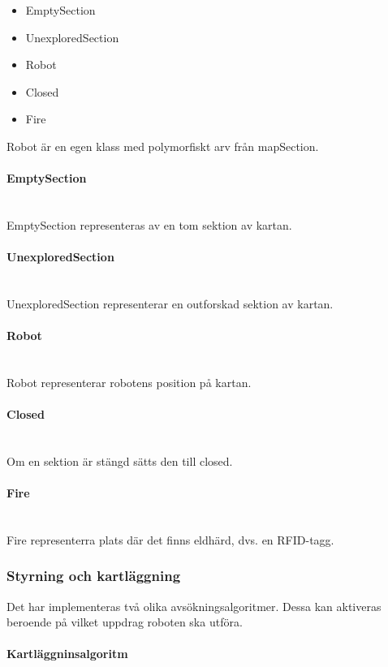 \documentclass[a4paper,12pt,fleqn]{article}
\begin{document}
\begin{itemize}
\item{EmptySection}
\item{UnexploredSection}
\item{Robot}
\item{Closed}
\item{Fire}
\end{itemize}

Robot är en egen klass med polymorfiskt arv från mapSection.

\paragraph{EmptySection} 
~\\
EmptySection representeras av en tom sektion av kartan. 

\paragraph{UnexploredSection} 
~\\
UnexploredSection representerar en outforskad sektion av kartan. 

\paragraph{Robot} 
~\\
Robot representerar robotens position på kartan. 

\paragraph{Closed} 
~\\
Om en sektion är stängd sätts den till closed.

\paragraph{Fire} 
~\\
Fire representerra plats där det finns eldhärd, dvs. en RFID-tagg. 
\newpage

\subsubsection{Styrning och kartläggning}
Det har implementeras två olika avsökningsalgoritmer. Dessa kan aktiveras beroende på vilket uppdrag roboten ska utföra. 

\paragraph{Kartläggninsalgoritm}
\end{document}
